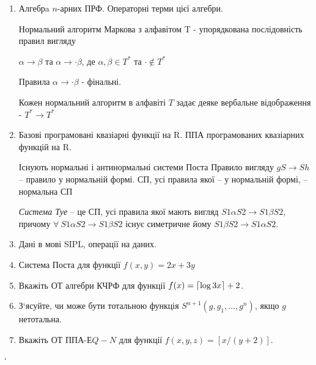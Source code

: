 \documentclass[a4paper, 12pt]{article}
\DeclarePairedDelimiter{\ceil}{\lceil}{\rceil}
\begin{document}
\begin{enumerate}
{\begin{test-answer}
\end{test-answer}
}
\item{Алгебрa $n$-арних ПРФ. Операторні терми цієї алгебри.\par
\begin{test-answer}
Нормальний алгоритм Маркова з алфавітом T - упорядкована послідовність правил вигляду\par
$\alpha \rightarrow \beta $ та 
$\alpha \rightarrow \cdot \beta $, де 
$\alpha, \beta \in T^{*}$ та $\cdot \notin T^{*}$\par
Правила $\alpha \rightarrow \cdot \beta $ - фінальні.\par
Кожен нормальний алгоритм в алфавіті $T$ задає деяке вербальне відображення - $T^{*}\rightarrow T^{*}$
\end{test-answer}
}
\item{Базові програмовані квазіарні функції на R. ППА програмованих квазіарних функцій на R.
\begin{test-answer}
Існують нормальні і антинормальні системи Поста
Правило вигляду $gS\rightarrow Sh$ – правило у нормальній формі.
СП, усі правила якої – у нормальній формі, – нормальна СП\par
\textit{Система Туе} – це СП, усі правила якої мають вигляд $S1\alpha S2 \rightarrow S1 \beta 
S2$, причому $\forall \:S1\alpha S2 \rightarrow S1 \beta S2$ існує симетричне йому $S1\beta S2 \rightarrow S1 \alpha S2$.
\end{test-answer}
\newpage
}
\item{Дані в мові SIPL, операції на даних.}
\item{Система Поста для функції $f(x, y) = 2x+3y$}
\item{Вкажіть ОТ алгебри КЧРФ для функції $f(x) = \ceil{\log{3}{x}}+2$.}
\item{З‘ясуйте, чи може бути тотальною функція $S^{n+1}(g, g_1 , \dots , g^n )$, якщо $g$ нетотальна.}
\item{Вкажіть ОТ ППА-$ЕQ-N$ для функції $f(x, y, z) = [x/(y+2)]$.}
\end{enumerate}`
\end{document}
